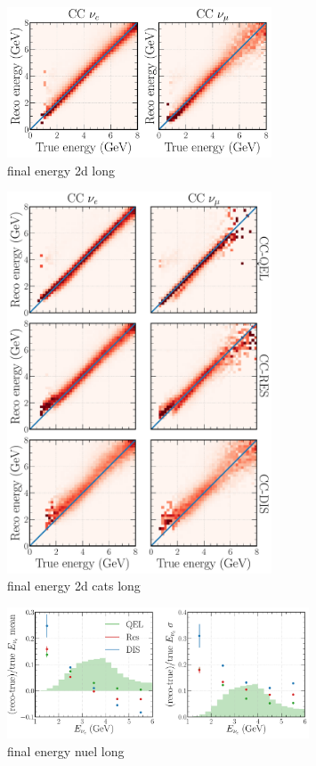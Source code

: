 \begin{figure} %
    \includegraphics[width=0.7\textwidth]{diagrams/6-cvn/chipsnet/final_energy_2d.pdf}
    \caption[final energy 2d short]
    {final energy 2d long}
    \label{fig:final_energy_2d}
\end{figure}

\begin{figure} %
    \includegraphics[width=0.7\textwidth]{diagrams/6-cvn/chipsnet/final_energy_2d_cats.pdf}
    \caption[final energy 2d cats short]
    {final energy 2d cats long}
    \label{fig:final_energy_2d_cats}
\end{figure}

\begin{figure} %
    \includegraphics[width=0.8\textwidth]{diagrams/6-cvn/chipsnet/final_energy_nuel.pdf}
    \caption[final energy nuel short]
    {final energy nuel long}
    \label{fig:final_energy_nuel}
\end{figure}

